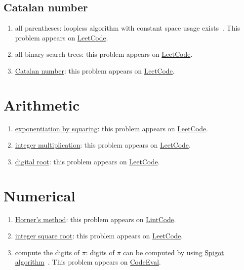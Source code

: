 \subsection{Catalan number}
\begin{enumerate}
\item all parentheses: loopless algorithm with constant space usage exists~\cite{Ruskey2008}. This problem appears on \href{https://leetcode.com/problems/generate-parentheses/}{LeetCode}.
\item all binary search trees: this problem appears on \href{https://leetcode.com/problems/unique-binary-search-trees-ii/}{LeetCode}.
\item \href{https://en.wikipedia.org/wiki/Catalan_number}{Catalan number}: this problem appears on \href{https://leetcode.com/problems/unique-binary-search-trees/}{LeetCode}.
\end{enumerate}

\section{Arithmetic}
\begin{enumerate}
\item \href{https://en.wikipedia.org/wiki/Exponentiation_by_squaring}{exponentiation by squaring}: this problem appears on \href{https://leetcode.com/problems/powx-n/}{LeetCode}.
\item \href{https://en.wikipedia.org/wiki/Multiplication_algorithm}{integer multiplication}: this problem appears on \href{https://leetcode.com/problems/multiply-strings/}{LeetCode}.
\item \href{https://en.wikipedia.org/wiki/Digital_root}{digital root}: this problem appears on \href{https://leetcode.com/problems/add-digits/}{LeetCode}.
\end{enumerate}

\section{Numerical}
\begin{enumerate}
\item \href{https://en.wikipedia.org/wiki/Horner\%27s_method}{Horner's method}: this problem appears on \href{http://www.lintcode.com/en/problem/hash-function/}{LintCode}.
\item \href{https://en.wikipedia.org/wiki/Integer_square_root}{integer square root}: this problem appears on \href{https://leetcode.com/problems/sqrtx/}{LeetCode}.
\item compute the digits of $\pi$:  digits of $\pi$ can be computed by using \href{https://en.wikipedia.org/wiki/Spigot_algorithm}{Spigot algorithm}~\cite{Gibbons2006}.  This problem appears on \href{https://www.codeeval.com/public_sc/228/}{CodeEval}.
\end{enumerate}

